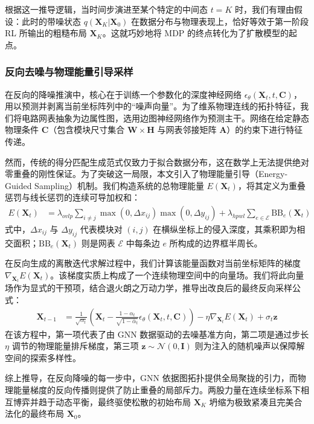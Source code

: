\documentclass[12pt, a4paper]{article}
\begin{document}
根据这一推导逻辑，当时间步演进至某个特定的中间态 $t=K$ 时，我们有理由假设：此时的带噪状态 $q(\mathbf{X}_K|\mathbf{X}_0)$ 在数据分布与物理表现上，恰好等效于第一阶段 RL 所输出的粗糙布局 $\mathbf{X}_K$。这就巧妙地将 MDP 的终点转化为了扩散模型的起点。

\subsubsection{反向去噪与物理能量引导采样}

在反向的降噪推演中，核心在于训练一个参数化的深度神经网络 $\epsilon_\theta(\mathbf{X}_t, t, \mathbf{C})$，用以预测并剥离当前坐标阵列中的“噪声向量”。为了维系物理连线的拓扑特征，我们将电路网表抽象为边属性图，选用边图神经网络作为预测主干。网络在给定静态物理条件 $\mathbf{C}$（包含模块尺寸集合 $\mathbf{W} \times \mathbf{H}$ 与网表邻接矩阵 $\mathbf{A}$）的约束下进行特征传递。

然而，传统的得分匹配生成范式仅致力于拟合数据分布，这在数学上无法提供绝对零重叠的刚性保证。为了突破这一局限，本文引入了物理能量引导（Energy-Guided Sampling）机制。我们构造系统的总物理能量 $E(\mathbf{X}_t)$，将其定义为重叠惩罚与线长惩罚的连续可导加权和：
$$\begin{aligned} 
E(\mathbf{X}_t) &= \lambda_{ovlp} \sum_{i \neq j} \max(0, \Delta x_{ij}) \max(0, \Delta y_{ij}) + \lambda_{hpwl} \sum_{e \in \mathcal{E}} \text{BB}_{e}(\mathbf{X}_t) 
\end{aligned}$$
式中，$\Delta x_{ij}$ 与 $\Delta y_{ij}$ 代表模块对 $(i,j)$ 在横纵坐标上的侵入深度，其乘积即为相交面积；$\text{BB}_{e}(\mathbf{X}_t)$ 则是网表 $\mathcal{E}$ 中每条边 $e$ 所构成的边界框半周长。

在反向生成的离散迭代求解过程中，我们计算该能量函数对当前坐标矩阵的梯度 $\nabla_{\mathbf{X}_t} E(\mathbf{X}_t)$。该梯度实质上构成了一个连续物理空间中的向量场。我们将此向量场作为显式的干预项，结合退火朗之万动力学，推导出改良后的最终反向采样公式：
$$\begin{aligned} 
\mathbf{X}_{t-1} &= \frac{1}{\sqrt{\alpha_t}} \left( \mathbf{X}_t - \frac{1-\alpha_t}{\sqrt{1-\bar{\alpha}_t}} \epsilon_\theta(\mathbf{X}_t, t, \mathbf{C}) \right) - \eta \nabla_{\mathbf{X}_t} E(\mathbf{X}_t) + \sigma_t \mathbf{z} 
\end{aligned}$$
在该方程中，第一项代表了由 GNN 数据驱动的去噪基准方向，第二项是通过步长 $\eta$ 调节的物理能量排斥梯度，第三项 $\mathbf{z} \sim \mathcal{N}(0, \mathbf{I})$ 则为注入的随机噪声以保障解空间的探索多样性。

综上推导，在反向降噪的每一步中，GNN 依据图拓扑提供全局聚拢的引力，而物理能量梯度的反向传播则提供了防止重叠的局部斥力。两股力量在连续坐标系下相互博弈并趋于动态平衡，最终驱使松散的初始布局 $\mathbf{X}_K$ 坍缩为极致紧凑且完美合法化的最终布局 $\mathbf{X}_0$。
\end{document}
